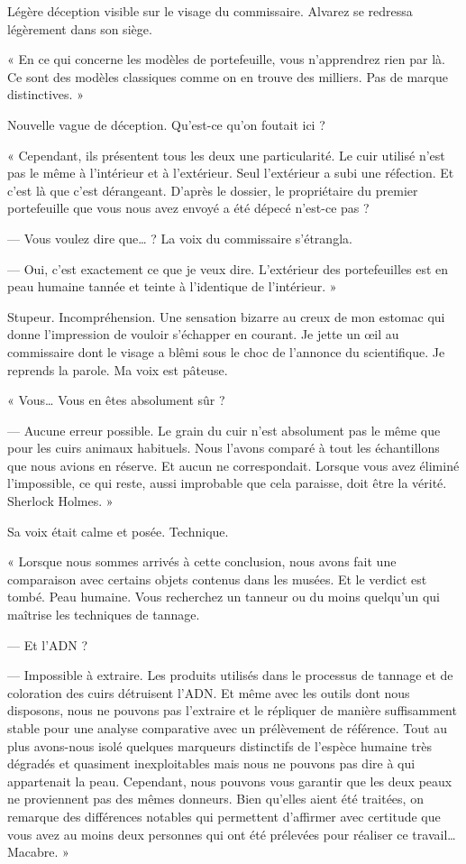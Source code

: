 Légère déception visible sur le visage du commissaire. Alvarez se redressa légèrement dans son siège.

« En ce qui concerne les modèles de portefeuille, vous n'apprendrez rien par là. Ce sont des modèles classiques comme 
on en trouve des milliers. Pas de marque distinctives. »

Nouvelle vague de déception. Qu'est-ce qu'on foutait ici ?

« Cependant, ils présentent tous les deux une particularité. Le cuir utilisé n'est pas le même à l'intérieur et à 
l'extérieur. Seul l'extérieur a subi une réfection. Et c'est là que c'est dérangeant. D'après le dossier, le 
propriétaire du premier portefeuille que vous nous avez envoyé a été dépecé n'est-ce pas ?

— Vous voulez dire que… ? La voix du commissaire s'étrangla.

— Oui, c'est exactement ce que je veux dire. L'extérieur des portefeuilles est en peau humaine tannée et teinte à 
l'identique de l'intérieur. »

Stupeur. Incompréhension. Une sensation bizarre au creux de mon estomac qui donne l'impression de vouloir s'échapper en 
courant. Je jette un œil au commissaire dont le visage a blêmi sous le choc de l'annonce du scientifique. Je reprends 
la parole. Ma voix est pâteuse.

« Vous… Vous en êtes absolument sûr ?

— Aucune erreur possible. Le grain du cuir n'est absolument pas le même que pour les cuirs animaux habituels. Nous 
l'avons comparé à tout les échantillons que nous avions en réserve. Et aucun ne correspondait. Lorsque vous avez éliminé 
l'impossible, ce qui reste, aussi improbable que cela paraisse, doit être la vérité. Sherlock Holmes. »

Sa voix était calme et posée. Technique.

« Lorsque nous sommes arrivés à cette conclusion, nous avons fait une comparaison avec certains objets contenus dans 
les musées. Et le verdict est tombé. Peau humaine. Vous recherchez un tanneur ou du moins quelqu'un qui maîtrise les 
techniques de tannage.

— Et l'ADN ?

— Impossible à extraire. Les produits utilisés dans le processus de tannage et de coloration des cuirs détruisent 
l'ADN. Et même avec les outils dont nous disposons, nous ne pouvons pas l'extraire et le répliquer de manière 
suffisamment stable pour une analyse comparative avec un prélèvement de référence. Tout au plus avons-nous isolé 
quelques marqueurs distinctifs de l'espèce humaine très dégradés et quasiment inexploitables mais nous ne pouvons pas 
dire à qui appartenait la peau. Cependant, nous pouvons vous garantir que les deux peaux ne proviennent pas des mêmes 
donneurs. Bien qu'elles aient été traitées, on remarque des différences notables qui permettent d'affirmer avec 
certitude que vous avez au moins deux personnes qui ont été prélevées pour réaliser ce travail… Macabre. »

